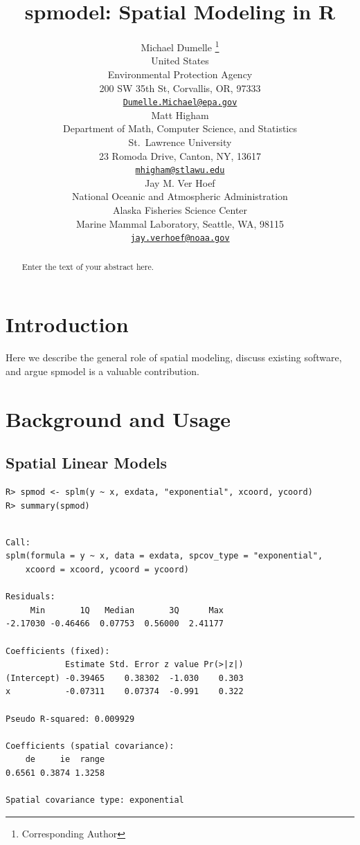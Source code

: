 \documentclass{article}
\title{spmodel: Spatial Modeling in \textbf{R}}
\author{
    Michael Dumelle
    \thanks{Corresponding Author}
   \\
    United States \\
    Environmental Protection Agency \\
  200 SW 35th St, Corvallis, OR, 97333 \\
  \texttt{\href{mailto:Dumelle.Michael@epa.gov}{\nolinkurl{Dumelle.Michael@epa.gov}}} \\
   \And
    Matt Higham
   \\
    Department of Math, Computer Science, and Statistics \\
    St.~Lawrence University \\
  23 Romoda Drive, Canton, NY, 13617 \\
  \texttt{\href{mailto:mhigham@stlawu.edu}{\nolinkurl{mhigham@stlawu.edu}}} \\
   \And
    Jay M. Ver Hoef
   \\
    National Oceanic and Atmospheric Administration \\
    Alaska Fisheries Science Center \\
  Marine Mammal Laboratory, Seattle, WA, 98115 \\
  \texttt{\href{mailto:jay.verhoef@noaa.gov}{\nolinkurl{jay.verhoef@noaa.gov}}} \\
  }
\begin{document}
\maketitle


\begin{abstract}
Enter the text of your abstract here.
\end{abstract}


\hypertarget{introduction}{%
\section{\texorpdfstring{Introduction
\label{sec:introduction}}{Introduction }}\label{introduction}}

Here we describe the general role of spatial modeling, discuss existing
software, and argue spmodel is a valuable contribution.

\hypertarget{background-and-usage}{%
\section{Background and Usage}\label{background-and-usage}}

\hypertarget{spatial-linear-models}{%
\subsection{Spatial Linear Models}\label{spatial-linear-models}}

\begin{verbatim}
R> spmod <- splm(y ~ x, exdata, "exponential", xcoord, ycoord)
R> summary(spmod)
\end{verbatim}

\begin{verbatim}

Call:
splm(formula = y ~ x, data = exdata, spcov_type = "exponential", 
    xcoord = xcoord, ycoord = ycoord)

Residuals:
     Min       1Q   Median       3Q      Max 
-2.17030 -0.46466  0.07753  0.56000  2.41177 

Coefficients (fixed):
            Estimate Std. Error z value Pr(>|z|)
(Intercept) -0.39465    0.38302  -1.030    0.303
x           -0.07311    0.07374  -0.991    0.322

Pseudo R-squared: 0.009929

Coefficients (spatial covariance):
    de     ie  range 
0.6561 0.3874 1.3258 

Spatial covariance type: exponential
\end{verbatim}
\end{document}

